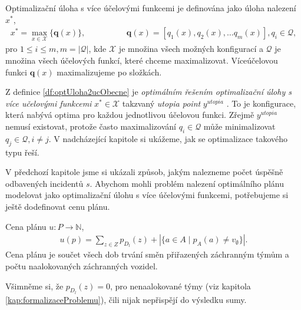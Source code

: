 \begin{definice}\label{df:optUloha2ucObecne}
  Optimalizační úloha s více účelovými funkcemi je definována jako úloha nalezení $x^*$,
  \begin{align*}
    x^* = \max_{x \in \mathcal{X}} \{ \mathbf{q}(x) \}, \hspace{50pt} &\mathbf{q}(x) = [q_1(x), q_2(x), \dots q_{m}(x)], q_i \in \mathcal{Q},
  \end{align*}
  pro $1 \leq i \leq m, m = |\mathcal{Q}|$,
  kde $\mathcal{X}$ je množina všech možných konfigurací a $\mathcal{Q}$ je množina všech účelových funkcí, které chceme maximalizovat.
  Víceúčelovou funkci $\mathbf{q}(x)$ maximalizujeme po složkách.
\end{definice}
Z definice \ref{df:optUloha2ucObecne} je \textit{optimálním řešením optimalizační úlohy s více učelovými funkcemi}
$x^* \in \mathcal{X}$ takzvaný \textit{utopia point} $y^{utopia}$ \cite{AlgOptBook}.
To je konfigurace, která nabývá optima pro každou jednotlivou účelovou funkci.
Zřejmě $y^{utopia}$ nemusí existovat, protože často maximalizování $q_i \in \mathcal{Q}$ může minimalizovat $q_j \in \mathcal{Q}, i \neq j$.
V nadcházející kapitole si ukážeme, jak se optimalizace takového typu řeší.

V předchozí kapitole jsme si ukázali způsob, jakým nalezneme počet úspěšně odbavených incidentů $s$. 
Abychom mohli problém nalezení optimálního plánu modelovat jako optimalizační úlohu s více účelovými funkcemi, potřebujeme si ještě dodefinovat cenu plánu.
\begin{definice}\label{df:cenaPlanu}
  Cena plánu $u \colon P \rightarrow \mathbb{N}$,
  \begin{align*}
    u(p) = \sum_{z \in Z} p_{D_l}(z) + |\{ a \in A \mid p_{A}(a) \neq v_{\emptyset} \}|.
  \end{align*}
  Cena plánu je součet všech dob trvání směn přiřazených záchranným týmům a počtu naalokovaných záchranných vozidel.
\end{definice}

Všimněme si, že $p_{D_l}(z) = 0$, pro nenaalokované týmy (viz kapitola \ref{kap:formalizaceProblemu}), čili nijak nepřispějí do výsledku sumy.

